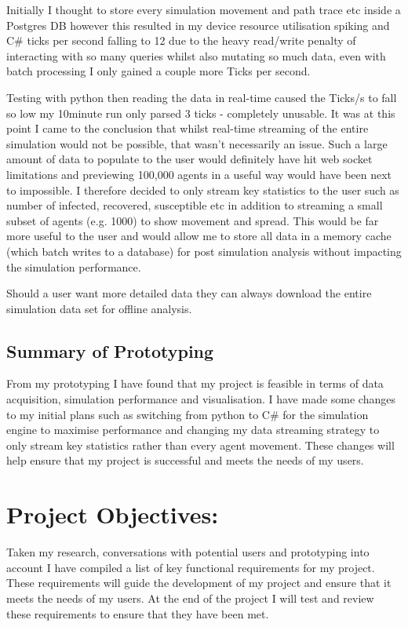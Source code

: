 Initially I thought to store every simulation movement and path trace etc inside a Postgres DB however this resulted in my device resource utilisation spiking and C\# ticks per second falling to 12 due to the heavy read/write penalty of interacting with so many queries whilst also mutating so much data, even with batch processing I only gained a couple more Ticks per second. 

Testing with python then reading the data in real-time caused the Ticks/s to fall so low my 10minute run only parsed 3 ticks - completely unusable. It was at this point I came to the conclusion that whilst real-time streaming of the entire simulation would not be possible, that wasn't necessarily an issue. Such a large amount of data to populate to the user would definitely have hit web socket limitations and previewing 100,000 agents in a useful way would have been next to impossible. I therefore decided to only stream key statistics to the user such as number of infected, recovered, susceptible etc in addition to streaming a small subset of agents (e.g. 1000) to show movement and spread. This would be far more useful to the user and would allow me to store all data in a memory cache (which batch writes to a database) for post simulation analysis without impacting the simulation performance.

Should a user want more detailed data they can always download the entire simulation data set for offline analysis.


\subsection{Summary of Prototyping}
From my prototyping I have found that my project is feasible in terms of data acquisition, simulation performance and visualisation. I have made some changes to my initial plans such as switching from python to C\# for the simulation engine to maximise performance and changing my data streaming strategy to only stream key statistics rather than every agent movement. These changes will help ensure that my project is successful and meets the needs of my users.
\section{Project Objectives:}
Taken my research, conversations with potential users and prototyping into account I have compiled a list of key functional requirements for my project. These requirements will guide the development of my project and ensure that it meets the needs of my users. At the end of the project I will test and review these requirements to ensure that they have been met.
